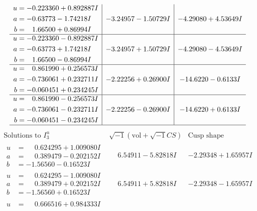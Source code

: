 \documentclass[1p]{elsarticle_modified}
\theoremstyle{definition}
\newcommand{\I}{\sqrt{-1}}
\begin{document}
$$\begin{array}{c|c|c}
\begin{aligned}
u &= -0.223360 + 0.892887 I \\
a &= -0.63773 - 1.74218 I \\
b &= \phantom{-}1.66500 + 0.86994 I\end{aligned}
 & -3.24957 - 1.50729 I & -4.29080 + 4.53649 I \\ \hline\begin{aligned}
u &= -0.223360 - 0.892887 I \\
a &= -0.63773 + 1.74218 I \\
b &= \phantom{-}1.66500 - 0.86994 I\end{aligned}
 & -3.24957 + 1.50729 I & -4.29080 - 4.53649 I \\ \hline\begin{aligned}
u &= \phantom{-}0.861990 + 0.256573 I \\
a &= -0.736061 + 0.232711 I \\
b &= -0.060451 + 0.234245 I\end{aligned}
 & -2.22256 + 0.26900 I & -14.6220 - 0.6133 I \\ \hline\begin{aligned}
u &= \phantom{-}0.861990 - 0.256573 I \\
a &= -0.736061 - 0.232711 I \\
b &= -0.060451 - 0.234245 I\end{aligned}
 & -2.22256 - 0.26900 I & -14.6220 + 0.6133 I\\
 \hline 
 \end{array}$$\newpage$$\begin{array}{c|c|c}  
\text{Solutions to }I^u_{3}& \I (\text{vol} + \sqrt{-1}CS) & \text{Cusp shape}\\
 \hline 
\begin{aligned}
u &= \phantom{-}0.624295 + 1.009080 I \\
a &= \phantom{-}0.389479 - 0.202152 I \\
b &= -1.56560 - 0.16523 I\end{aligned}
 & \phantom{-}6.54911 - 5.82818 I & -2.29348 + 1.65957 I \\ \hline\begin{aligned}
u &= \phantom{-}0.624295 - 1.009080 I \\
a &= \phantom{-}0.389479 + 0.202152 I \\
b &= -1.56560 + 0.16523 I\end{aligned}
 & \phantom{-}6.54911 + 5.82818 I & -2.29348 - 1.65957 I \\ \hline\begin{aligned}
u &= \phantom{-}0.666516 + 0.984333 I \\

\end{aligned}
\end{array}$$
\end{document}
